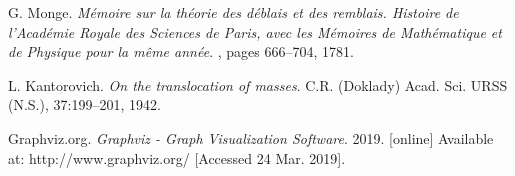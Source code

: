 \documentclass[journal,onecolumn]{IEEEtran}
\begin{document}



\ifCLASSOPTIONcaptionsoff
  \newpage
\fi





%
%
%
\begin{thebibliography}{1}

G. Monge. \emph{Mémoire sur la théorie des déblais et des remblais. Histoire de l’Académie Royale des Sciences de Paris, avec les Mémoires de Mathématique et de Physique pour la même année}. , pages 666–704, 1781.

L. Kantorovich. \emph{On the translocation of masses}. C.R. (Doklady) Acad. Sci. URSS (N.S.), 37:199–201, 1942.

Graphviz.org. \emph{Graphviz - Graph Visualization Software}. 2019. [online] Available at: http://www.graphviz.org/ [Accessed 24 Mar. 2019].

\end{thebibliography}







\end{document}
